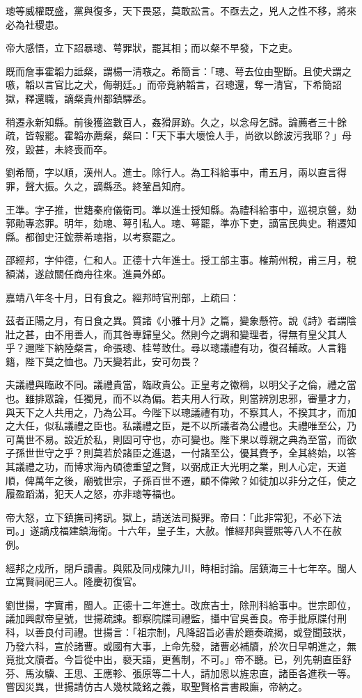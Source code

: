 \begin{pinyinscope}
璁等威權既盛，黨與復多，天下畏惡，莫敢訟言。不亟去之，兇人之性不移，將來必為社稷患。

帝大感悟，立下詔暴璁、萼罪狀，罷其相；而以粲不早發，下之吏。

既而詹事霍韜力詆粲，謂楊一清嗾之。希簡言：「璁、萼去位由聖斷。且使犬謂之嗾，韜以言官比之犬，侮朝廷。」而帝竟納韜言，召璁還，奪一清官，下希簡詔獄，釋還職，謫粲貴州都鎮驛丞。

稍遷永新知縣。前後獲盜數百人，姦猾屏跡。久之，以念母乞歸。論薦者三十餘疏，皆報罷。霍韜亦薦粲，粲曰：「天下事大壞憸人手，尚欲以餘波污我耶？」母歿，毀甚，未終喪而卒。

劉希簡，字以順，漢州人。進士。除行人。為工科給事中，甫五月，兩以直言得罪，聲大振。久之，謫縣丞。終鞏昌知府。

王準。字子推，世籍秦府儀衛司。準以進士授知縣。為禮科給事中，巡視京營，劾郭勛專恣罪。明年，劾璁、萼引私人。璁、萼罷，準亦下吏，謫富民典史。稍遷知縣。都御史汪鋐萘希璁指，以考察罷之。

邵經邦，字仲德，仁和人。正德十六年進士。授工部主事。榷荊州稅，甫三月，稅額滿，遂啟關任商舟往來。進員外郎。

嘉靖八年冬十月，日有食之。經邦時官刑部，上疏曰：

茲者正陽之月，有日食之異。質諸《小雅十月》之篇，變象懸符。說《詩》者謂陰壯之甚，由不用善人，而其咎專歸皇父。然則今之調和變理者，得無有皇父其人乎？邇陛下納陸粲言，命張璁、桂萼致仕。尋以璁議禮有功，復召輔政。人言籍籍，陛下莫之恤也。乃天變若此，安可勿畏？

夫議禮與臨政不同。議禮貴當，臨政貴公。正皇考之徽稱，以明父子之倫，禮之當也。雖排眾論，任獨見，而不以為偏。若夫用人行政，則當辨別忠邪，審量才力，與天下之人共用之，乃為公耳。今陛下以璁議禮有功，不察其人，不揆其才，而加之大任，似私議禮之臣也。私議禮之臣，是不以所議者為公禮也。夫禮唯至公，乃可萬世不易。設近於私，則固可守也，亦可變也。陛下果以尊親之典為至當，而欲子孫世世守之乎？則莫若於諸臣之進退，一付諸至公，優其賚予，全其終始，以答其議禮之功，而博求海內碩德重望之賢，以弼成正大光明之業，則人心定，天道順，俾萬年之後，廟號世宗，子孫百世不遷，顧不偉歟？如徒加以非分之任，使之履盈蹈滿，犯天人之怒，亦非璁等福也。

帝大怒，立下鎮撫司拷訊。獄上，請送法司擬罪。帝曰：「此非常犯，不必下法司。」遂謫戍福建鎮海衛。十六年，皇子生，大赦。惟經邦與豐熙等八人不在赦例。

經邦之戍所，閉戶讀書。與熙及同戍陳九川，時相討論。居鎮海三十七年卒。閩人立寓賢祠祀三人。隆慶初復官。

劉世揚，字實甫，閩人。正德十二年進士。改庶吉士，除刑科給事中。世宗即位，議加興獻帝皇號，世揚疏諫。都察院牒司禮監，攝中官吳善良。帝手批原牒付刑科，以善良付司禮。世揚言：「祖宗制，凡降詔旨必書於題奏疏揭，或登聞鼓狀，乃發六科，宣於諸曹。或國有大事，上命先發，諸曹必補牘，於次日早朝進之，無竟批文牘者。今旨從中出，褻天語，更舊制，不可。」帝不聽。已，列先朝直臣舒芬、馬汝驥、王思、王應軫、張原等二十人，請加恩以旌忠直，諸臣各進秩一等。嘗因災異，世揚請仿古人幾杖箴銘之義，取聖賢格言書殿廡，帝納之。


\end{pinyinscope}
